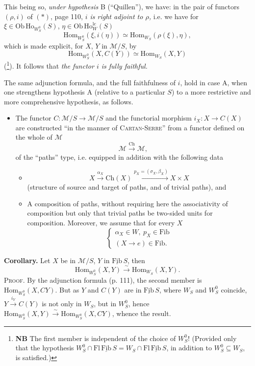 \documentclass[11pt]{article}
\newcommand{\printedpage}[1]{\marginpar{\footnotesize p.~#1}}
\newcommand{\msp}[1]{\marginpar{\footnotesize [#1]}}
\newcommand{\Fib}{\underline{\mathrm{Fib}}\,}
\newcommand{\Ho}{\mathrm{Ho}}
\newcommand{\Hom}{\mathrm{Hom}}
\newcommand{\Fl}{\mathrm{Fl}}
\newcommand{\M}{\mathcal{M}}
\begin{document}
This being so, \textit{under hypothesis} B (``Quillen''), we have: in the pair of functors $(\rho, i)$ of $(*)$, page 110, \textit{$i$ is right adjoint to $\rho$,} i.e. we have for $\xi \in \mathrm{Ob}\,\Ho_{W_S^0}(S)$, $\eta \in \mathrm{Ob}\,\Ho^{\mathrm{lc}}_W(S)$
\[\Hom_{W_S^0}(\xi, i(\eta)) \simeq \Hom_{W_S}(\rho(\xi), \eta),\]
which is made explicit, for $X$, $Y$ in $\M/S$, by
\[\boxed{\Hom_{W_S^0}(X, C(Y)) \simeq \Hom_{W_S}(X, Y)}\]
(\footnote{\textbf{NB} The first member is independent of the choice of $W_S^0$! (Provided only that the hypothesis $W_S^0 \cap \Fl\,\Fib S = W_S \cap \Fl\,\Fib S$, in addition to $W_S^0 \subseteq W_S$, is satisfied.)}). It follows that \textit{the functor $i$ is fully faithful.}

The same adjunction formula, and the
\msp{page 112}
full faithfulness of $i$, hold in case A, when one strengthens hypothesis A (relative to a particular $S$) to a more restrictive and more comprehensive hypothesis, as follows.

\begin{itemize}[leftmargin=3em]
\item[A$'$)] The functor $C : \M/S \longrightarrow \M/S$ and the functorial morphism $i_X : X \longrightarrow C(X)$ are constructed ``in the manner of \textsc{Cartan-Serre}'' from a functor defined on the whole of $\M$
\[\M \xrightarrow{\mathrm{Ch}} \M,\]
of the ``paths'' type, i.e. equipped in addition with the following data
\begin{itemize}[leftmargin=3em]
\item[a)] \[X \xrightarrow{\alpha_X} \mathrm{Ch}(X) \xrightarrow{p_X = (\sigma_X, \beta_X)} X \times X\]
(structure of source and target of paths, and of trivial paths), and
\item[b)] A composition of paths, without requiring here the associativity of composition but only that trivial paths be two-sided units for composition. Moreover, we assume that for every $X$ %
\[\begin{cases} \alpha_X \in W,\ p_X \in \mathrm{Fib} \\ (X \longrightarrow e) \in \mathrm{Fib}. \end{cases}\]
\end{itemize}
\end{itemize}

\printedpage{71}
\msp{page 113}
\textbf{Corollary.} Let $X$ be in $\M/S$, $Y$ in $\Fib S$, then
\[\Hom_{W_S^0}(X, Y) \xrightarrow{\sim} \Hom_{W_S}(X, Y).\]
\textsc{Proof}. By the adjunction formula (p. 111), the second member is $\Hom_{W_S^0}(X, CY)$. But as $Y$ and $C(Y)$ are in $\Fib S$, where $W_S$ and $W_S^0$ coincide, $Y \xrightarrow{i_Y} C(Y)$ is not only in $W_S$, but in $W_S^0$, hence $\Hom_{W_S^0}(X, Y) \xrightarrow{\sim} \Hom_{W_S^0}(X, CY)$, whence the result.
\end{document}
